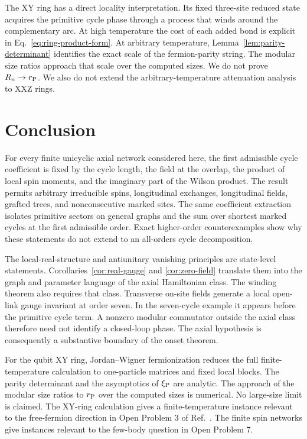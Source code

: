 \documentclass[11pt]{article}
\begin{document}
The XY ring has a direct locality interpretation.  Its fixed three-site
reduced state acquires the primitive cycle phase through a process that winds
around the complementary arc.  At high temperature the cost of each added
bond is explicit in Eq.~\eqref{eq:ring-product-form}.  At arbitrary
temperature, Lemma~\ref{lem:parity-determinant} identifies the exact scale of
the fermion-parity string.  The modular size ratios approach that scale over
the computed sizes.  We do not prove $R_n\to r_{\rm P}$.  We also do not extend
the arbitrary-temperature attenuation analysis to XXZ rings.

\section{Conclusion}
\label{sec:conclusion}

For every finite unicyclic axial network considered here, the first admissible
cycle coefficient is fixed by the cycle length, the field at the overlap, the
product of local spin moments, and the imaginary part of the Wilson product.
The result permits arbitrary irreducible spins, longitudinal exchanges,
longitudinal fields, grafted trees, and nonconsecutive marked sites.  The same
coefficient extraction isolates primitive sectors on general graphs and the
sum over shortest marked cycles at the first admissible order.  Exact
higher-order counterexamples show why these statements do not extend to an
all-orders cycle decomposition.

The local-real-structure and antiunitary vanishing principles are state-level
statements.  Corollaries~\ref{cor:real-gauge} and \ref{cor:zero-field}
translate them into the graph and parameter language of the axial
Hamiltonian class.  The winding theorem also requires that class.  Transverse
on-site fields generate a local open-link gauge invariant at order seven.  In
the seven-cycle example it
appears before the primitive cycle term.  A nonzero modular commutator outside
the axial class therefore need not identify a closed-loop phase.  The axial
hypothesis is consequently a substantive boundary of the onset theorem.

For the qubit XY ring, Jordan--Wigner fermionization reduces the full
finite-temperature calculation to one-particle matrices and fixed local
blocks.  The parity determinant and the asymptotics of $\xi_{\rm P}$ are
analytic.  The approach of the modular size ratios to $r_{\rm P}$ over the
computed sizes is numerical.  No large-size limit is claimed.  The XY-ring
calculation gives a finite-temperature instance relevant to the free-fermion
direction in Open Problem 3 of Ref.~\cite{KimEtAl2022PRB}.  The finite spin
networks give instances relevant to the few-body question in Open Problem 7.
\end{document}
